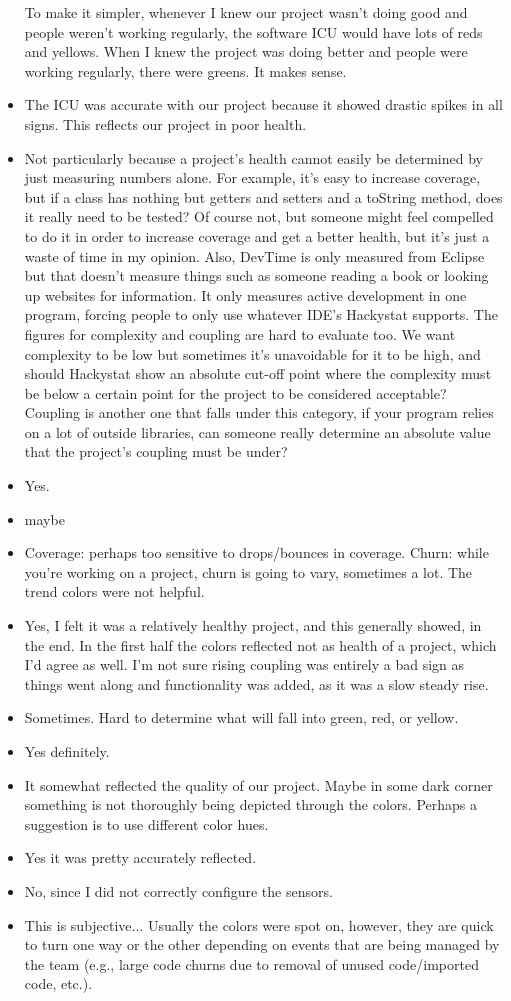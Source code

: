 \documentclass[11pt]{article}
\begin{document}
\begin{itemize}
To make it simpler, whenever I knew our project wasn't doing good and people weren't working regularly, the software ICU would have lots of reds and yellows. When I knew the project was doing better and people were working regularly, there were greens. It makes sense.
\item The ICU was accurate with our project because it showed drastic spikes in all signs.  This reflects our project in poor health.
\item Not particularly because a project's health cannot easily be determined by just measuring numbers alone. For example, it's easy to increase coverage, but if a class has nothing but getters and setters and a toString method, does it really need to be tested? Of course not, but someone might feel compelled to do it in order to increase coverage and get a better health, but it's just a waste of time in my opinion. Also, DevTime is only measured from Eclipse but that doesn't measure things such as someone reading a book or looking up websites for information. It only measures active development in one program, forcing people to only use whatever IDE's Hackystat supports. The figures for complexity and coupling are hard to evaluate too. We want complexity to be low but sometimes it's unavoidable for it to be high, and should Hackystat show an absolute cut-off point where the complexity must be below a certain point for the project to be considered acceptable? Coupling is another one that falls under this category, if your program relies on a lot of outside libraries, can someone really determine an absolute value that the project's coupling must be under?
\item Yes.
\item maybe
\item Coverage: perhaps too sensitive to drops/bounces in coverage.
Churn: while you're working on a project, churn is going to vary, sometimes a lot.  The trend colors were not helpful.
\item Yes, I felt it was a relatively healthy project, and this generally showed, in the end.  In the first half the colors reflected not as health of a project, which I'd agree as well.  I'm not sure rising coupling was entirely a bad sign as things went along and functionality was added, as it was a slow steady rise.
\item Sometimes.  Hard to determine what will fall into green, red, or yellow.
\item Yes definitely.
\item It somewhat reflected the quality of our project. Maybe in some dark corner something is not thoroughly being depicted through the colors. Perhaps a suggestion is to use different color hues.
\item Yes it was pretty accurately reflected.
\item No, since I did not correctly configure the sensors.
\item This is subjective...  Usually the colors were spot on, however, they are quick to turn one way or the other depending on events that are being managed by the team (e.g., large code churns due to removal of unused code/imported code, etc.).
\end{itemize}
\end{document}
